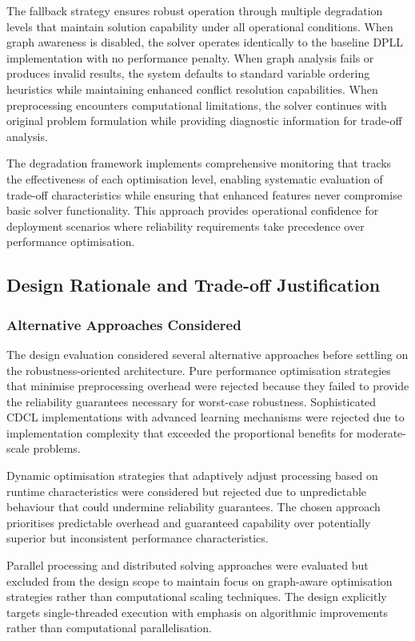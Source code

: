 The fallback strategy ensures robust operation through multiple degradation levels that maintain solution capability under all operational conditions. When graph awareness is disabled, the solver operates identically to the baseline DPLL implementation with no performance penalty. When graph analysis fails or produces invalid results, the system defaults to standard variable ordering heuristics while maintaining enhanced conflict resolution capabilities. When preprocessing encounters computational limitations, the solver continues with original problem formulation while providing diagnostic information for trade-off analysis.

The degradation framework implements comprehensive monitoring that tracks the effectiveness of each optimisation level, enabling systematic evaluation of trade-off characteristics while ensuring that enhanced features never compromise basic solver functionality. This approach provides operational confidence for deployment scenarios where reliability requirements take precedence over performance optimisation.

\subsection{Design Rationale and Trade-off Justification}

\subsubsection{Alternative Approaches Considered}

The design evaluation considered several alternative approaches before settling on the robustness-oriented architecture. Pure performance optimisation strategies that minimise preprocessing overhead were rejected because they failed to provide the reliability guarantees necessary for worst-case robustness. Sophisticated CDCL implementations with advanced learning mechanisms were rejected due to implementation complexity that exceeded the proportional benefits for moderate-scale problems.

Dynamic optimisation strategies that adaptively adjust processing based on runtime characteristics were considered but rejected due to unpredictable behaviour that could undermine reliability guarantees. The chosen approach prioritises predictable overhead and guaranteed capability over potentially superior but inconsistent performance characteristics.

Parallel processing and distributed solving approaches were evaluated but excluded from the design scope to maintain focus on graph-aware optimisation strategies rather than computational scaling techniques. The design explicitly targets single-threaded execution with emphasis on algorithmic improvements rather than computational parallelisation.

